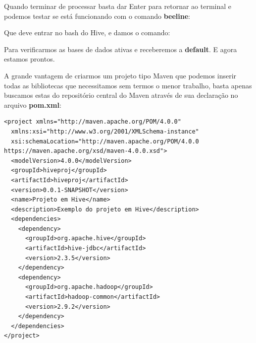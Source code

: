 \documentclass[a4paper,11pt]{article}
\begin{document}
Quando terminar de processar basta dar Enter para retornar ao terminal e podemos testar se está funcionando com o comando \textbf{beeline}: \\

Que deve entrar no bash do Hive, e damos o comando: 

Para verificarmos as bases de dados ativas e receberemos a \textbf{default}. E agora estamos prontos.

A grande vantagem de criarmos um projeto tipo Maven que podemos inserir todas as bibliotecas que necessitamos sem termos o menor trabalho, basta apenas buscamos estas do repositório central do Maven através de sua declaração no arquivo \textbf{pom.xml}:
\begin{lstlisting}[]
<project xmlns="http://maven.apache.org/POM/4.0.0"
  xmlns:xsi="http://www.w3.org/2001/XMLSchema-instance"
  xsi:schemaLocation="http://maven.apache.org/POM/4.0.0 https://maven.apache.org/xsd/maven-4.0.0.xsd">
  <modelVersion>4.0.0</modelVersion>
  <groupId>hiveproj</groupId>
  <artifactId>hiveproj</artifactId>
  <version>0.0.1-SNAPSHOT</version>
  <name>Projeto em Hive</name>
  <description>Exemplo do projeto em Hive</description>
  <dependencies>
    <dependency>
      <groupId>org.apache.hive</groupId>
      <artifactId>hive-jdbc</artifactId>
      <version>2.3.5</version>
    </dependency>
    <dependency>
      <groupId>org.apache.hadoop</groupId>
      <artifactId>hadoop-common</artifactId>
      <version>2.9.2</version>
    </dependency>
  </dependencies>
</project>
\end{lstlisting}
\end{document}
